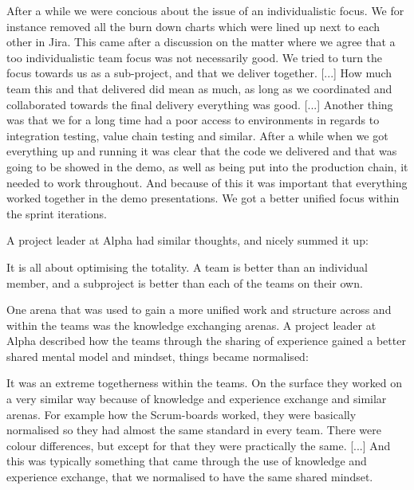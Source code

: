 \begin{fancyquotes}
After a while we were concious about the issue of an individualistic focus. We for instance removed all the burn down charts which were lined up next to each other in Jira. This came after a discussion on the matter where we agree that a too individualistic team focus was not necessarily good. We tried to turn the focus towards us as a sub-project, and that we deliver together. [...] How much team this and that delivered did mean as much, as long as we coordinated and collaborated towards the final delivery everything was good. [...] Another thing was that we for a long time had a poor access to environments in regards to integration testing, value chain testing and similar. After a while when we got everything up and running it was clear that the code we delivered and that was going to be showed in the demo, as well as being put into the production chain, it needed to work throughout. And because of this it was important that everything worked together in the demo presentations. We got a better unified focus within the sprint iterations.
\end{fancyquotes}

A project leader at Alpha had similar thoughts, and nicely summed it up:

\begin{fancyquotes}
It is all about optimising the totality. A team is better than an individual member, and a subproject is better than each of the teams on their own.
\end{fancyquotes}

One arena that was used to gain a more unified work and structure across and within the teams was the knowledge exchanging arenas. A project leader at Alpha described how the teams through the sharing of experience gained a better shared mental model and mindset, things became normalised:

\begin{fancyquotes}
It was an extreme togetherness within the teams. On the surface they worked on a very similar way because of knowledge and experience exchange and similar arenas. For example how the Scrum-boards worked, they were basically normalised so they had almost the same standard in every team. There were colour differences, but except for that they were practically the same. [...] And this was typically something that came through the use of knowledge and experience exchange, that we normalised to have the same shared mindset.
\end{fancyquotes}

